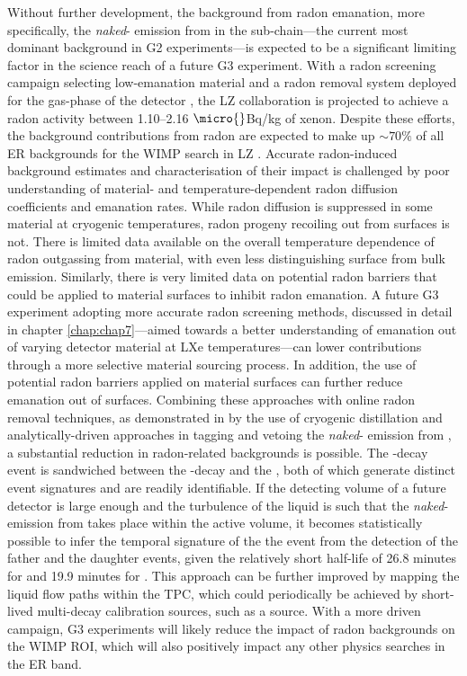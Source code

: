Without further development, the background from radon emanation, more specifically, the \textit{naked}-\beta{} emission from \PbTOF{} in the \RnTTT{} sub-chain---the current most dominant background in G2 experiments---is expected to be a significant limiting factor in the science reach of a future G3 experiment. With a radon screening campaign selecting low-emanation material and a radon removal system deployed for the gas-phase of the detector \cite{lz_screening, lz_tdr}, the LZ collaboration is projected to achieve a radon activity between 1.10--2.16 $\micro{}$Bq/kg of xenon. Despite these efforts, the background contributions from radon are expected to make up $\sim70\%$ of all ER backgrounds for the WIMP search in LZ \cite{akerib2018projected}. Accurate radon-induced background estimates and characterisation of their impact is challenged by poor understanding of material- and temperature-dependent radon diffusion coefficients and emanation rates. While radon diffusion is suppressed in some material at cryogenic temperatures, radon progeny recoiling out from surfaces is not. There is limited data available on the overall temperature dependence of radon outgassing from material, with even less distinguishing surface from bulk emission. Similarly, there is very limited data on potential radon barriers that could be applied to material surfaces to inhibit radon emanation. A future G3 experiment adopting more accurate radon screening methods, discussed in detail in chapter \ref{chap:chap7}---aimed towards a better understanding of emanation out of varying detector material at LXe temperatures---can lower contributions through a more selective material sourcing process. In addition, the use of potential radon barriers applied on material surfaces can further reduce emanation out of surfaces. Combining these approaches with online radon removal techniques, as demonstrated in \cite{Aprile:2017kop} by the use of cryogenic distillation and analytically-driven approaches in tagging and vetoing the \textit{naked}-\beta{} emission from \PbTOF{}, a substantial reduction in radon-related backgrounds is possible. The \PbTOF{} \beta{}-decay event is sandwiched between the \PoTOE{} \alpha-decay and the \BiPoTOF{}, both of which generate distinct event signatures and are readily identifiable. If the detecting volume of a future detector is large enough and the turbulence of the liquid is such that the \textit{naked}-\beta{} emission from \PbTOF{} takes place within the active volume, it becomes statistically possible to infer the temporal signature of the the \PbTOF{} event from the detection of the father and the daughter events, given the relatively short half-life of 26.8 minutes for \PbTOF{} and 19.9 minutes for \BiTOF{}. This approach can be further improved by mapping the liquid flow paths within the TPC, which could periodically be achieved by short-lived multi-decay calibration sources, such as a \RnTTZ{} source. With a more driven campaign, G3 experiments will likely reduce the impact of radon backgrounds on the WIMP ROI, which will also positively impact any other physics searches in the ER band.  



